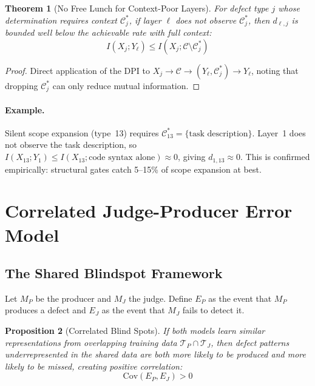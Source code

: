 \documentclass[11pt, a4paper]{article}
\newtheorem{theorem}{Theorem}[section]
\newtheorem{proposition}[theorem]{Proposition}
\theoremstyle{definition}
\theoremstyle{remark}
\begin{document}
\begin{theorem}[No Free Lunch for Context-Poor Layers]
\label{thm:nofreelunch}
For defect type $j$ whose determination requires context $\mathcal{C}_j^*$, if layer $\ell$ does not observe $\mathcal{C}_j^*$, then $d_{\ell,j}$ is bounded well below the achievable rate with full context:
\begin{equation}
I(X_j; Y_\ell) \leq I(X_j; \mathcal{C} \setminus \mathcal{C}_j^*)
\end{equation}
\end{theorem}

\begin{proof}
Direct application of the DPI to $X_j \to \mathcal{C} \to (Y_\ell, \mathcal{C}_j^*) \to Y_\ell$, noting that dropping $\mathcal{C}_j^*$ can only reduce mutual information.
\end{proof}

\paragraph{Example.} Silent scope expansion (type~13) requires $\mathcal{C}_{13}^* = \{\text{task description}\}$. Layer~1 does not observe the task description, so $I(X_{13}; Y_1) \leq I(X_{13}; \text{code syntax alone}) \approx 0$, giving $d_{1,13} \approx 0$. This is confirmed empirically: structural gates catch 5--15\% of scope expansion at best.


\section{Correlated Judge-Producer Error Model}
\label{sec:correlation}

\subsection{The Shared Blindspot Framework}

Let $M_P$ be the producer and $M_J$ the judge. Define $E_P$ as the event that $M_P$ produces a defect and $E_J$ as the event that $M_J$ fails to detect it.

\begin{proposition}[Correlated Blind Spots]
\label{prop:correlated}
If both models learn similar representations from overlapping training data $\mathcal{T}_P \cap \mathcal{T}_J$, then defect patterns underrepresented in the shared data are both more likely to be produced and more likely to be missed, creating positive correlation:
\begin{equation}
\mathrm{Cov}(E_P, E_J) > 0
\end{equation}
\end{proposition}
\end{document}
